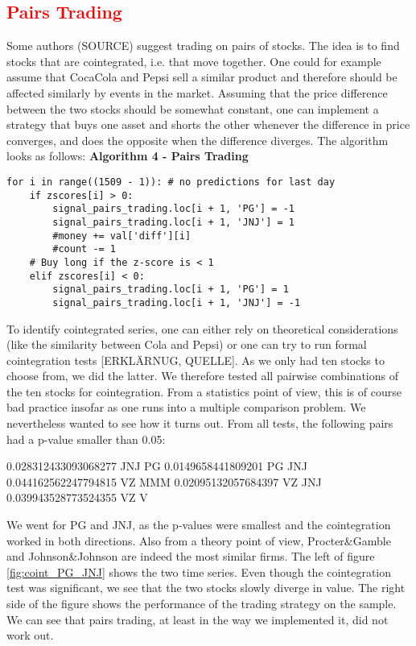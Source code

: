 \subsection{\textcolor{red}{Pairs Trading}}
Some authors (SOURCE) suggest trading on pairs of stocks. The idea is to find stocks that are cointegrated, i.e. that move together. One could for example assume that CocaCola and Pepsi sell a similar product and therefore should be affected similarly by events in the market. Assuming that the price difference between the two stocks should be somewhat constant, one can implement a strategy that buys one asset and shorts the other whenever the difference in price converges, and does the opposite when the difference diverges. The algorithm looks as follows: 
\vspace{2ex}
\textbf{\small{Algorithm 4 - Pairs Trading}}
\vspace{-1ex}
\begin{verbatim}
for i in range((1509 - 1)): # no predictions for last day
    if zscores[i] > 0:
        signal_pairs_trading.loc[i + 1, 'PG'] = -1
        signal_pairs_trading.loc[i + 1, 'JNJ'] = 1
        #money += val['diff'][i]
        #count -= 1
    # Buy long if the z-score is < 1
    elif zscores[i] < 0:
        signal_pairs_trading.loc[i + 1, 'PG'] = 1
        signal_pairs_trading.loc[i + 1, 'JNJ'] = -1
\end{verbatim}

To identify cointegrated series, one can either rely on theoretical considerations (like the similarity between Cola and Pepsi) or one can try to run formal cointegration tests [ERKLÄRNUG, QUELLE]. As we only had ten stocks to choose from, we did the latter. We therefore tested all pairwise combinations of the ten stocks for cointegration. From a statistics point of view, this is of course bad practice insofar as one runs into a multiple comparison problem. We nevertheless wanted to see how it turns out. From all tests, the following pairs had a p-value smaller than 0.05: 

0.028312433093068277 JNJ PG
0.0149658441809201 PG JNJ
0.044162562247794815 VZ MMM
0.02095132057684397 VZ JNJ
0.039943528773524355 VZ V

We went for PG and JNJ, as the p-values were smallest and the cointegration worked in both directions. Also from a theory point of view, Procter\&Gamble and Johnson\&Johnson are indeed the most similar firms. The left of figure \ref{fig:coint_PG_JNJ} shows the two time series. Even though the cointegration test was significant, we see that the two stocks slowly diverge in value. The right side of the figure shows the performance of the trading strategy on the sample. We can see that pairs trading, at least in the way we implemented it, did not work out. 

